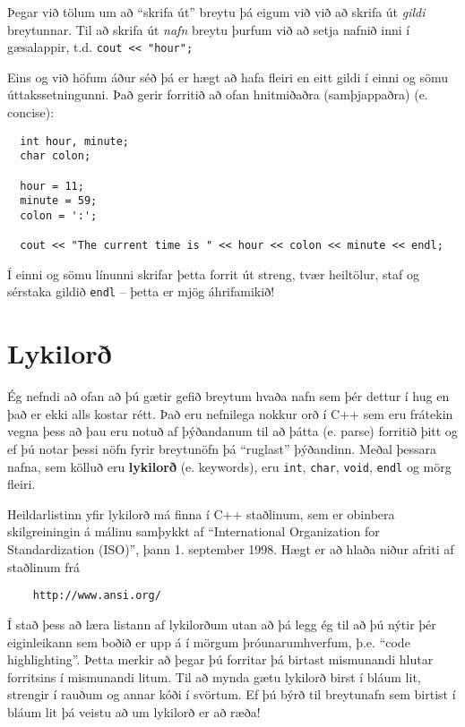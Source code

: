 Þegar við tölum um að ``skrifa út'' breytu þá eigum við við að skrifa út {\em gildi} breytunnar.
Til að skrifa út {\em nafn} breytu þurfum við að setja nafnið inni í gæsalappir, t.d. {\tt cout << "hour";}

Eins og við höfum áður séð þá er hægt að hafa fleiri en eitt gildi í einni og sömu úttakssetningunni.
Það gerir forritið að ofan hnitmiðaðra (samþjappaðra) (e. concise):

\begin{verbatim}
  int hour, minute;
  char colon;

  hour = 11;
  minute = 59;
  colon = ':';

  cout << "The current time is " << hour << colon << minute << endl;
\end{verbatim}
%
Í einni og sömu línunni skrifar þetta forrit út streng, tvær heiltölur, staf og sérstaka gildið {\tt endl} -- þetta er mjög áhrifamikið!

\section{Lykilorð}

Ég nefndi að ofan að þú gætir gefið breytum hvaða nafn sem þér dettur í hug en það er ekki alls kostar rétt.
Það eru nefnilega nokkur orð í C++ sem eru frátekin vegna þess að þau eru notuð af þýðandanum til að þátta (e. parse) forritið þitt og ef þú notar þessi nöfn fyrir breytunöfn þá ``ruglast'' þýðandinn.
Meðal þessara nafna, sem kölluð eru {\bf lykilorð} (e. keywords), eru {\tt int},
{\tt char}, {\tt void}, {\tt endl} og mörg fleiri.

Heildarlistinn yfir lykilorð má finna í C++ staðlinum, sem er obinbera skilgreiningin á málinu samþykkt af 
``International Organization for Standardization (ISO)'', þann 1. september 1998.
Hægt er að hlaða niður afriti af staðlinum frá 
\begin{verbatim}
    http://www.ansi.org/
\end{verbatim}
%
Í stað þess að læra listann af lykilorðum utan að þá legg ég til að þú nýtir þér eiginleikann sem boðið er upp á í mörgum þróunarumhverfum, þ.e. ``code highlighting''.
Þetta merkir að þegar þú forritar þá birtast mismunandi hlutar forritsins í mismunandi litum.
Til að mynda gætu lykilorð birst í bláum lit, strengir í rauðum og annar kóði í svörtum.
Ef þú býrð til breytunafn sem birtist í bláum lit þá veistu að um lykilorð er að ræða!

